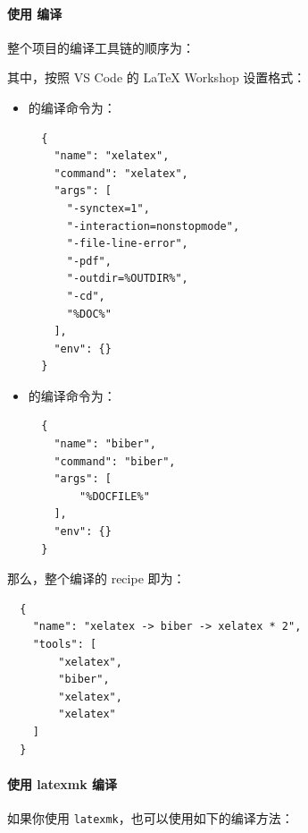 \paragraph{使用 {} 编译}
整个项目的编译工具链的顺序为：
\begin{center}
\end{center}


其中，按照 VS Code 的 LaTeX Workshop 设置格式：

\begin{itemize}
  \item {} 的编译命令为：
  \begin{verbatim}
  {
    "name": "xelatex",
    "command": "xelatex",
    "args": [
      "-synctex=1",
      "-interaction=nonstopmode",
      "-file-line-error",
      "-pdf",
      "-outdir=%OUTDIR%",
      "-cd",
      "%DOC%"
    ],
    "env": {}
  }
  \end{verbatim}
  \item {} 的编译命令为：
  \begin{verbatim}
  {
    "name": "biber",
    "command": "biber",
    "args": [
        "%DOCFILE%"
    ],
    "env": {}
  }
  \end{verbatim}
\end{itemize}

那么，整个编译的 recipe 即为：

\begin{verbatim}
  {
    "name": "xelatex -> biber -> xelatex * 2",
    "tools": [
        "xelatex",
        "biber",
        "xelatex",
        "xelatex"
    ]
  }
\end{verbatim}

\paragraph{使用 latexmk 编译}
如果你使用 \texttt{latexmk}，也可以使用如下的编译方法：


